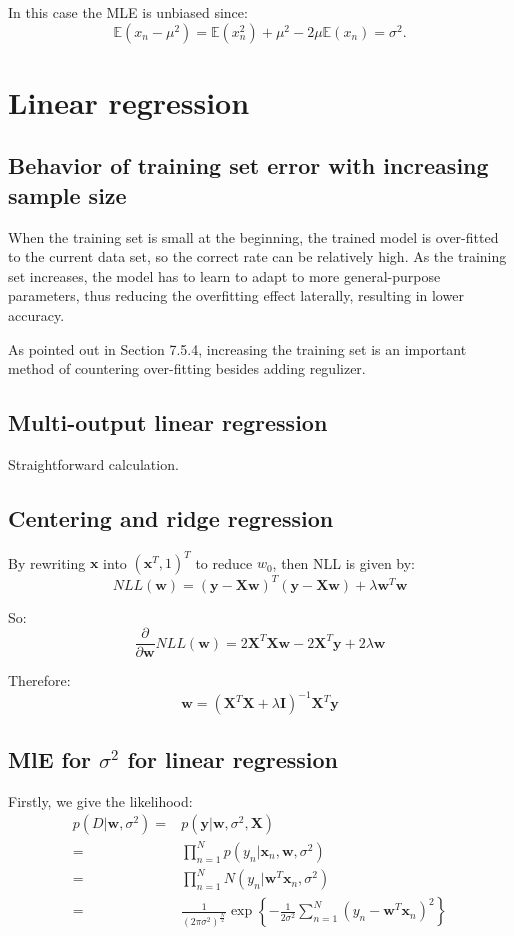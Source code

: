 \documentclass[UTF8]{ctexart}
\begin{document}
In this case the MLE is unbiased since:
$$\mathbb{E}(x_{n}-\mu^{2})=\mathbb{E}(x_{n}^{2})+\mu^{2}-2\mu\mathbb{E}(x_{n})=\sigma^{2}.$$




\newpage
\section{Linear regression}
\subsection{Behavior of training set error with increasing sample size}
When the training set is small at the beginning, the trained model is over-fitted to the current data set, so the correct rate can be relatively high. As the training set increases, the model has to learn to adapt to more general-purpose parameters, thus reducing the overfitting effect laterally, resulting in lower accuracy.

As pointed out in Section 7.5.4, increasing the training set is an important method of countering over-fitting besides adding regulizer.

\subsection{Multi-output linear regression}
Straightforward calculation.

\subsection{Centering and ridge regression}
By rewriting $\textbf{x}$ into $(\textbf{x}^T{},1)^{T}$ to reduce $w_{0}$, then NLL is given by:
$$NLL(\textbf{w})=(\textbf{y}-\textbf{X}\textbf{w})^{T}(\textbf{y}-\textbf{X}\textbf{w})+\lambda \textbf{w}^{T}\textbf{w}$$

So:
$$\frac{\partial}{\partial \textbf{w}}NLL(\textbf{w})=2\textbf{X}^{T}\textbf{X}\textbf{w}-2\textbf{X}^{T}\textbf{y}+2\lambda \textbf{w}$$

Therefore:
$$\textbf{w}=(\textbf{X}^{T}\textbf{X}+\lambda \textbf{I})^{-1}\textbf{X}^{T}\textbf{y}$$

\subsection{MlE for $\sigma^{2}$ for linear regression}
Firstly, we give the likelihood:
\begin{align}
p(D|\textbf{w},\sigma^{2})=&p(\textbf{y}|\textbf{w},\sigma^{2},\textbf{X})\nonumber \\
=&\prod_{n=1}^{N}p(y_{n}|\textbf{x}_{n},\textbf{w},\sigma^{2})\nonumber \\
=&\prod_{n=1}^{N}N(y_{n}|\textbf{w}^{T}\textbf{x}_{n},\sigma^{2})\nonumber \\
=&\frac{1}{(2\pi\sigma^{2})^{\frac{N}{2}}}\exp\left\{ -\frac{1}{2\sigma^{2}}\sum_{n=1}^{N}(y_{n}-\textbf{w}^{T}\textbf{x}_{n})^{2} \right\}\nonumber
\end{align}
\end{document}
